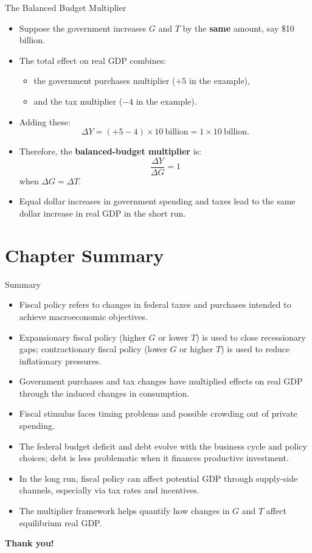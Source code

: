 \documentclass[aspectratio=169]{beamer}
\begin{document}
\begin{frame}{The Balanced Budget Multiplier}
\transfade
\begin{itemize}
  \item Suppose the government increases \(G\) and \(T\) by the \textbf{same} amount, say \$10 billion.
  \item The total effect on real GDP combines:
  \begin{itemize}
    \item the government purchases multiplier (\(+5\) in the example),
    \item and the tax multiplier (\(-4\) in the example).
  \end{itemize}
  \item Adding these:
  \[
    \Delta Y = (+5 - 4)\times 10\ \text{billion} = 1 \times 10\ \text{billion}.
  \]
  \item Therefore, the \textbf{balanced-budget multiplier} is:
  \[
    \frac{\Delta Y}{\Delta G} = 1
  \]
  when \(\Delta G = \Delta T\).
  \item Equal dollar increases in government spending and taxes lead to the same dollar increase in real GDP in the short run.
\end{itemize}
\end{frame}

\section*{Chapter Summary}

\begin{frame}{Summary}
\transfade
\begin{itemize}
  \item Fiscal policy refers to changes in federal taxes and purchases intended to achieve macroeconomic objectives.
  \item Expansionary fiscal policy (higher \(G\) or lower \(T\)) is used to close recessionary gaps;
        contractionary fiscal policy (lower \(G\) or higher \(T\)) is used to reduce inflationary pressures.
  \item Government purchases and tax changes have multiplied effects on real GDP
        through the induced changes in consumption.
  \item Fiscal stimulus faces timing problems and possible crowding out of private spending.
  \item The federal budget deficit and debt evolve with the business cycle and policy choices;
        debt is less problematic when it finances productive investment.
  \item In the long run, fiscal policy can affect potential GDP through supply-side channels,
        especially via tax rates and incentives.
  \item The multiplier framework helps quantify how changes in \(G\) and \(T\) affect equilibrium real GDP.
\end{itemize}
\end{frame}

\begin{frame}
\centering
\Huge \textbf{Thank you!}
\end{frame}
\end{document}
